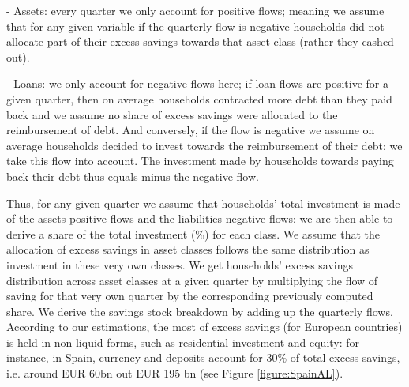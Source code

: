 - Assets: every quarter we only account for positive flows; meaning we assume that for any given variable if the quarterly flow is negative households did not allocate part of their excess savings towards that asset class (rather they cashed out).

- Loans: we only account for negative flows here; if loan flows are positive for a given quarter, then on average households contracted more debt than they paid back and we assume no share of excess savings were allocated to the reimbursement of debt. 
And conversely, if the flow is negative we assume on average households decided to invest towards the reimbursement of their debt: we take this flow into account. The investment made by households towards paying back their debt thus equals minus the negative flow. 

Thus, for any given quarter we assume that households' total investment is made of the assets positive flows and the liabilities negative flows: we are then able to derive a share of the total investment (\%) for each class. 
We assume that the allocation of excess savings in asset classes follows the same distribution as investment in these very own classes. 
We get households' excess savings distribution across asset classes at a given quarter by multiplying the flow of saving for that very own quarter by the corresponding previously computed share. 
We derive the savings stock breakdown by adding up the quarterly flows. According to our estimations, the most of excess savings (for European countries) is held in non-liquid forms, such as residential investment and equity: for instance, in Spain, currency and deposits account for 30\% of total excess savings, i.e. around EUR 60bn out EUR 195 bn (see Figure \ref{figure:SpainAL}). 

